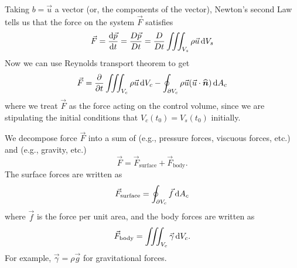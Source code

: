 
\lecture{}

\begin{node}\label{node:fall:lec04:conservation-of-linear-momentum}
Taking $b=\vec{u}$ a vector (or, the components of the vector),
Newton's second Law tells us that the force on the system $\vec{F}$
satisfies
\begin{equation}
\vec{F}=\frac{\mathrm{d}\vec{p}}{\mathrm{d} t}=\frac{D\vec{p}}{D t}=\frac{D}{Dt}\iiint_{V_{s}}\rho\vec{u}\,\mathrm{d} V_{s}
\end{equation}
Now we can use Reynolds transport theorem to get
\begin{equation}
\vec{F}=\frac{\partial}{\partial t}\iiint_{V_{c}}\rho\vec{u}\,\mathrm{d} V_{c}
-\oint_{\partial V_{c}}\rho\vec{u}(\vec{u}\cdot\widehat{\boldsymbol{n}})\,\mathrm{d} A_{c}
\end{equation}
where we treat $\vec{F}$ as the force acting on the control volume,
since we are stipulating the initial conditions that
$V_{c}(t_{0})=V_{s}(t_{0})$ initially.
\end{node}

\begin{definition}
We decompose force $\vec{F}$ into a sum of 
(e.g., pressure forces, viscuous forces, etc.) and 
(e.g., gravity, etc.)
\begin{equation}
\vec{F}=\vec{F}_{\text{surface}}+\vec{F}_{\text{body}}.
\end{equation}
The surface forces are written as
\begin{equation}
\vec{F}_{\text{surface}}=\oint_{\partial V_{c}}\vec{f}\,\mathrm{d} A_{c}
\end{equation}
where $\vec{f}$ is the force per unit area, and the body forces are
written as
\begin{equation}
\vec{F}_{\text{body}}=\iiint_{V_{c}}\vec{\gamma}\,\mathrm{d} V_{c}.
\end{equation}
For example, $\vec{\gamma}=\rho\vec{g}$ for gravitational forces.
\end{definition}

